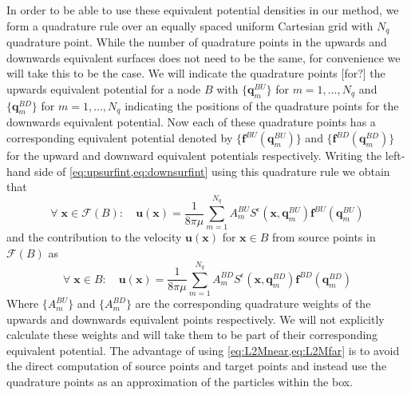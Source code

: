 In order to be able to use these equivalent potential densities in our method, we form a quadrature rule over an equally spaced uniform Cartesian grid with $N_q$ quadrature point. While the number of quadrature points in the upwards and downwards equivalent surfaces does not need to be the same, for convenience we will take this to be the case. We will indicate the quadrature points [for?] the upwards equivalent potential for a node $B$ with $\{\bm{q}^{BU}_m\}$ for $m=1,\dots,N_q$ and $\{\bm{q}^{BD}_m\}$ for $m=1,\dots,N_q$ indicating the positions of the quadrature points for the downwards equivalent potential. Now each of these quadrature points has a corresponding equivalent potential denoted by $\{\bm{f}^{BU}(\bm{q}^{BU}_m)\}$ and $\{\bm{f}^{BD}(\bm{q}^{BD}_m)\}$ for the upward and downward equivalent potentials respectively. Writing the left-hand side of \cref{eq:upsurfint,eq:downsurfint} using this quadrature rule we obtain that
\begin{equation}
\label{eq:L2Mfar}
    \forall \;\bm{x} \in \mathcal{F}(B): \quad \bm{u}(\bm{x})= \frac{1}{8 \pi \mu} \sum_{m=1}^{N_{q}} A_{m}^{BU} S^\epsilon\left(\bm{x}, \bm{q}_{m}^{B U}\right) \bm{f}^{B U}\left(\bm{q}_{m}^{B U}\right)
\end{equation}
and the contribution to the velocity $\bm{u}(\bm{x})$ for $\bm{x} \in B$ from source points in $\mathcal{F}(B)$ as
\begin{equation}
\label{eq:L2Mnear}
    \forall \;\bm{x} \in B: \quad \bm{u}(\bm{x})= \frac{1}{8 \pi \mu} \sum_{m=1}^{N_{q}} A_{m}^{BD} S^\epsilon\left(\bm{x}, \bm{q}_{m}^{B D}\right) \bm{f}^{B D}\left(\bm{q}_{m}^{B D}\right)
\end{equation}
Where $\{A_{m}^{BU}\}$ and $\{A_{m}^{BD}\}$ are the corresponding quadrature weights of the upwards and downwards equivalent points respectively. We will not explicitly calculate these weights and will take them to be part of their corresponding equivalent potential. The advantage of using \cref{eq:L2Mnear,eq:L2Mfar} is to avoid the direct computation of source points and target points and instead use the quadrature points as an approximation of the particles within the box.

